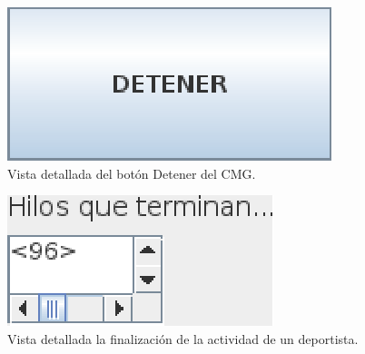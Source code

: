 \begin{figure}[h]
\begin{center}
 \includegraphics{./images/botonDetener.eps}
\end{center}
\caption{Vista detallada del bot\'on Detener del CMG.}
\end{figure}


\begin{figure}[h]
\begin{center}
 \includegraphics{./images/findeHilos.eps}
\end{center}
\caption{Vista detallada la finalizaci\'on de la actividad de un deportista.}
\end{figure}







